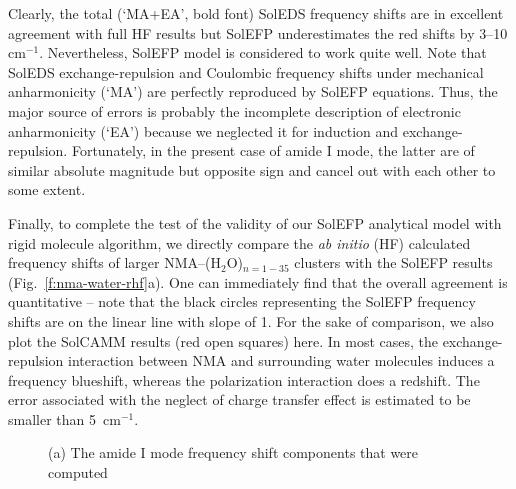 \documentclass[b5paper,oneside,fleqn,11pt]{book}
\begin{document}
\begin{refsection}
Clearly, the total (`MA+EA', bold font) SolEDS frequency shifts 
are in excellent agreement with full HF results
but SolEFP underestimates the red shifts by 3--10 cm$^{-1}$.
Nevertheless, 
SolEFP model is considered to work quite well. Note that 
SolEDS exchange\hyp{}repulsion
and Coulombic frequency shifts under mechanical anharmonicity (`MA')
are perfectly reproduced by SolEFP equations. Thus, the major source of errors
is probably the incomplete description of electronic anharmonicity (`EA')
because we neglected it for induction and exchange\hyp{}repulsion.
Fortunately, in the present case of amide I mode, the latter are
of similar absolute magnitude but opposite sign and cancel out with
each other to some extent.

Finally, to complete the test of the validity of our SolEFP
analytical model with rigid molecule algorithm, we directly
compare the \emph{ab initio} (HF) calculated frequency shifts of
larger NMA--(H$_2$O)$_{n = 1-35}$ clusters with the SolEFP results
(Fig.~\ref{f:nma-water-rhf}a). One can immediately find that the overall
agreement is quantitative -- note that the black circles representing
the SolEFP frequency shifts are on the linear line with
slope of 1. For the sake of comparison, we also plot the SolCAMM 
results (red open squares) here. In most cases, the
exchange\hyp{}repulsion interaction between NMA and surrounding
water molecules induces a frequency blueshift, whereas
the polarization interaction does a redshift. The error associated
with the neglect of charge transfer effect is estimated to
be smaller than 5~cm$^{-1}$.
%
\begin{figure}[t!]
\centering
\setlength\fboxsep{0.4pt}
\setlength\fboxrule{0.5pt}
\caption{
(a) The amide I mode frequency shift components that were computed
}
\end{figure}
\end{refsection}
\end{document}
